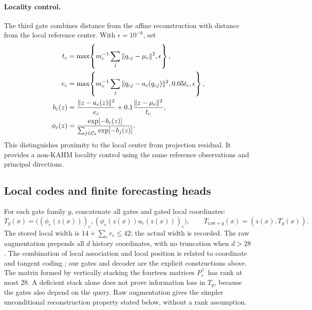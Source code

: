 \paragraph{Locality control.}
The third gate combines distance from the affine reconstruction with
distance from the local reference center.  With $\epsilon=10^{-6}$, set
\begin{align}
 t_c&=\max\!\left\{m_c^{-1}\sum_j\|q_{cj}-\mu_c\|^2,\epsilon\right\},\notag\\
 e_c&=\max\!\left\{m_c^{-1}\sum_j\|q_{cj}-a_c(q_{cj})\|^2,
                    0.05t_c,\epsilon\right\},\notag\\
 b_c(z)&=\frac{\|z-a_c(z)\|^2}{e_c}
          +0.1\frac{\|z-\mu_c\|^2}{t_c},\notag\\
 \phi_c(z)&=\frac{\exp[-b_c(z)]}
                    {\sum_{j\in\mathcal C_b}\exp[-b_j(z)]}.
 \label{eq:nf-locality-gates}
\end{align}
This distinguishes proximity to the local center from projection residual.
It provides a non-KAHM locality control using the same reference
observations and principal directions.

\subsection{Local codes and finite forecasting heads}
\label{sec:nf-local-features}

For each gate family $g$, concatenate all gates and gated local coordinates:
\begin{equation}
 T_g(x)=\bigl((\phi_c(z(x)))_c,
                  (\phi_c(z(x))u_c(z(x)))_c\bigr),\qquad
 T_{\mathrm{raw}+g}(x)=(z(x),T_g(x)).
 \label{eq:nf-local-code}
\end{equation}
The stored local width is $14+\sum_c r_c\leq42$; the actual width is recorded.
The raw augmentation prepends all $d$ history coordinates, with no truncation
when $d>28$.  The combination of local association and local position is
related to coordinate and tangent coding \citep{Yu2009LCC,Yu2010LTC};
our gates and decoder are the explicit constructions above.
The matrix formed by vertically stacking the fourteen matrices
$P_c^\top$ has rank at most 28.  A deficient stack alone does
not prove information loss in $T_g$, because the gates also depend on the
query.  Raw augmentation gives the simpler unconditional reconstruction
property stated below, without a rank assumption.

